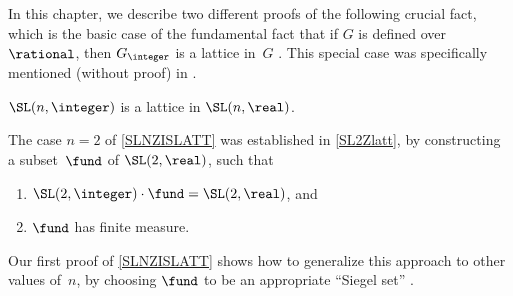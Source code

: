 
\standassumpfalse
{}
 \label{SLnZLattChap}
\standassumptrue


In this chapter, we describe two different proofs of the following crucial fact, which is the basic case of the fundamental fact that if $G$ is defined over~$\rational$, then $G_\integer$ is a lattice in~$G$ . This special case was specifically mentioned (without proof) in .

\begin{thm} \label{SLNZISLATT}
$\SL(n,\integer)$ is a lattice in\/ $\SL(n,\real)$.
\end{thm}

The case $n = 2$ of \cref{SLNZISLATT} was established in \cref{SL2Zlatt}, by constructing a subset~$\fund$ of $\SL(2,\real)$, such that
	\noprelistbreak
	\begin{enumerate}
	\item $\SL(2,\integer) \cdot \fund = \SL(2,\real)$,
	and
	\item $\fund$ has finite measure. 
	\end{enumerate}
Our first proof of \cref{SLNZISLATT} shows how to generalize this approach to other values of~$n$, by choosing $\fund$ to be an appropriate ``Siegel set'' .

